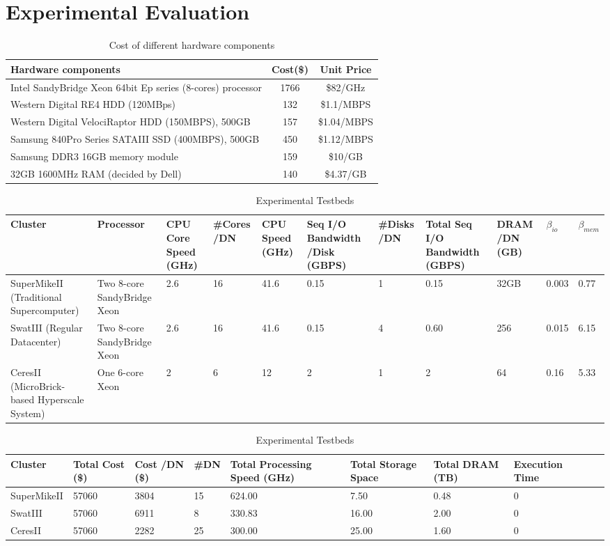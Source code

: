 \documentclass[journal]{IEEEtran}
\begin{document}
\section{Experimental Evaluation}
\begin{table}[!t]
\caption{Cost of different hardware components}
\label{tab:Cost}
\centering
\begin{tabular}{|p{4cm}|c|c|}
\hline
Hardware components & Cost(\$) & Unit Price\\
\hline
Intel SandyBridge Xeon 64bit Ep series (8-cores) processor & 1766 & \$82/GHz\\
\hline
Western Digital RE4 HDD (120MBps) & 132 & \$1.1/MBPS\\
\hline
Western Digital VelociRaptor HDD (150MBPS), 500GB & 157 & \$1.04/MBPS\\
\hline
Samsung 840Pro Series SATAIII SSD (400MBPS), 500GB & 450 & \$1.12/MBPS\\
\hline
Samsung DDR3 16GB memory module & 159 & \$10/GB\\
\hline
32GB 1600MHz RAM (decided by Dell) & 140 & \$4.37/GB\\
\hline
\end{tabular}
\end{table}
\begin{table}[!t]
\caption{Experimental Testbeds}
\label{tab:Testbeds}
\centering
\begin{tabular}{|p{2cm}|p{2cm}|p{1cm}|p{1cm}|p{1cm}|p{1cm}|p{1cm}|p{1cm}|p{1cm}|p{1cm}|p{1cm}|}
\hline
Cluster & Processor & CPU Core Speed (GHz) & \#Cores /DN & CPU Speed (GHz) & Seq I/O Bandwidth /Disk (GBPS) & \#Disks /DN & Total Seq I/O Bandwidth (GBPS) & DRAM /DN (GB) & $\beta_{io}$ & $\beta_{mem}$\\
\hline
SuperMikeII (Traditional Supercomputer) & Two 8-core SandyBridge Xeon & 2.6 & 16 & 41.6 & 0.15 & 1 & 0.15 & 32GB & 0.003 & 0.77\\
\hline
SwatIII (Regular Datacenter) & Two 8-core SandyBridge Xeon & 2.6 &  16 & 41.6 & 0.15 & 4 & 0.60 & 256 & 0.015 & 6.15\\
\hline
CeresII (MicroBrick-based Hyperscale System) & One 6-core Xeon & 2 & 6 & 12 & 2 & 1 & 2 & 64 & 0.16 & 5.33\\
\hline
\end{tabular}
\end{table}

\begin{table}[!t]
\caption{Experimental Testbeds}
\label{tab:ScalingCost}
\centering
\begin{tabular}{|p{2cm}|p{1cm}|p{1cm}|p{1cm}|p{2cm}|p{2cm}|p{2cm}|p{1cm}|p{1cm}|p{1cm}|}
\hline
Cluster & Total Cost (\$) & Cost /DN (\$) & \#DN & Total Processing Speed (GHz) & Total Storage Space & Total DRAM (TB) & Execution Time\\
\hline
SuperMikeII& 57060 & 3804 & 15 & 624.00 & 7.50 & 0.48 & 0 \\
\hline
SwatIII& 57060 & 6911 & 8 & 330.83 & 16.00 & 2.00 & 0 \\
\hline
CeresII & 57060 & 2282 & 25 & 300.00 & 25.00 & 1.60 & 0\\
\hline
\end{tabular}
\end{table}
\end{document}
